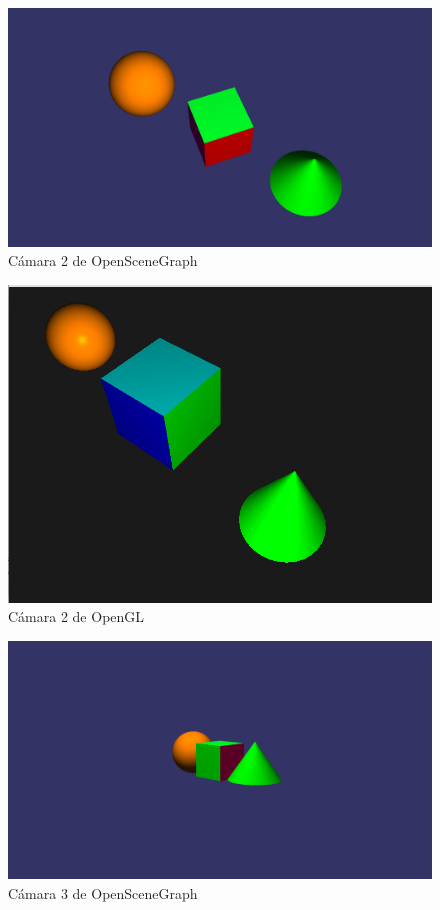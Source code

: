 \documentclass{article}
\begin{document}
\begin{figure}[H]
\centering
\includegraphics[width=\linewidth]{2osg}
\caption{Cámara 2 de OpenSceneGraph}
\label{fig:2osg}
\end{figure}

\begin{figure}[H]
\centering
\includegraphics[width=\linewidth]{2gl}
\caption{Cámara 2 de OpenGL}
\label{fig:2gl}
\end{figure}

\begin{figure}[H]
\centering
\includegraphics[width=\linewidth]{3osg}
\caption{Cámara 3 de OpenSceneGraph}
\label{fig:3osg}
\end{figure}
\end{document}

